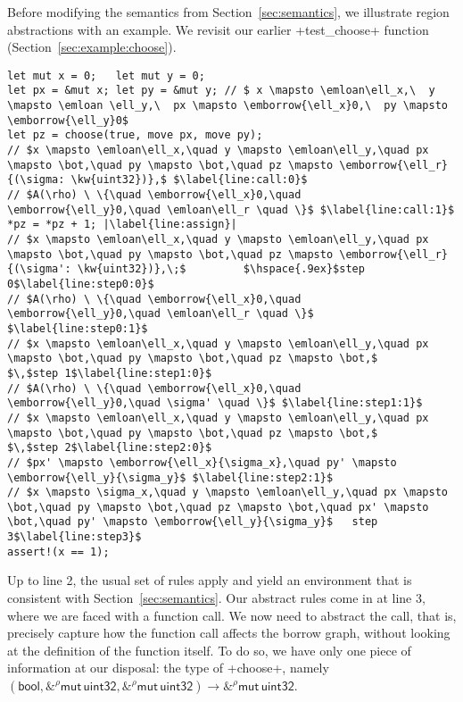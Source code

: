 \documentclass[acmsmall,screen]{acmart}
\newcommand{\sref}[1]{Section~\ref{sec:#1}}
\newcommand\kw[1]{\ensuremath{\mathsf{#1}}}
\newcommand\tmbrw[2]{\ensuremath{\mathsf{\&}^#1\mathsf{mut}\,#2}}
\newcommand\emborrow[2]{\ensuremath{\mathsf{borrow}^m\,#1\;#2}}
\newcommand\emloan[1]{\ensuremath{\mathsf{loan}^m\,#1}}
\begin{document}
Before modifying the semantics from \sref{semantics}, we illustrate region abstractions
with an example. We revisit our earlier \li+test_choose+ function
(\sref{example:choose}).
\begin{verbatim}
let mut x = 0;   let mut y = 0;
let px = &mut x; let py = &mut y; // $ x \mapsto \emloan\ell_x,\  y \mapsto \emloan \ell_y,\  px \mapsto \emborrow{\ell_x}0,\  py \mapsto \emborrow{\ell_y}0$
let pz = choose(true, move px, move py);
// $x \mapsto \emloan\ell_x,\quad y \mapsto \emloan\ell_y,\quad px \mapsto \bot,\quad py \mapsto \bot,\quad pz \mapsto \emborrow{\ell_r}{(\sigma: \kw{uint32})},$ $\label{line:call:0}$
// $A(\rho) \ \{\quad \emborrow{\ell_x}0,\quad \emborrow{\ell_y}0,\quad \emloan\ell_r \quad \}$ $\label{line:call:1}$
*pz = *pz + 1; |\label{line:assign}|
// $x \mapsto \emloan\ell_x,\quad y \mapsto \emloan\ell_y,\quad px \mapsto \bot,\quad py \mapsto \bot,\quad pz \mapsto \emborrow{\ell_r}{(\sigma': \kw{uint32})},\;$         $\hspace{.9ex}$step 0$\label{line:step0:0}$
// $A(\rho) \ \{\quad \emborrow{\ell_x}0,\quad \emborrow{\ell_y}0,\quad \emloan\ell_r \quad \}$ $\label{line:step0:1}$
// $x \mapsto \emloan\ell_x,\quad y \mapsto \emloan\ell_y,\quad px \mapsto \bot,\quad py \mapsto \bot,\quad pz \mapsto \bot,$                             $\,$step 1$\label{line:step1:0}$
// $A(\rho) \ \{\quad \emborrow{\ell_x}0,\quad \emborrow{\ell_y}0,\quad \sigma' \quad \}$ $\label{line:step1:1}$
// $x \mapsto \emloan\ell_x,\quad y \mapsto \emloan\ell_y,\quad px \mapsto \bot,\quad py \mapsto \bot,\quad pz \mapsto \bot,$                             $\,$step 2$\label{line:step2:0}$
// $px' \mapsto \emborrow{\ell_x}{\sigma_x},\quad py' \mapsto \emborrow{\ell_y}{\sigma_y}$ $\label{line:step2:1}$
// $x \mapsto \sigma_x,\quad y \mapsto \emloan\ell_y,\quad px \mapsto \bot,\quad py \mapsto \bot,\quad pz \mapsto \bot,\quad px' \mapsto \bot,\quad py' \mapsto \emborrow{\ell_y}{\sigma_y}$   step 3$\label{line:step3}$
assert!(x == 1);
\end{verbatim}
Up to line 2, the usual set of rules apply and yield an environment that is
consistent with \sref{semantics}.
Our abstract rules come in at line 3, where we are
faced with a function call. We now need to abstract the call, that is, precisely
capture how the function call affects the borrow graph, without looking at the
definition of the function itself. To do so, we have only one piece of
information at our disposal: the type of \li+choose+, namely
{\small
$(\kw{bool}, \tmbrw\rho{\kw{uint32}}, \tmbrw\rho{\kw{uint32}}) \to
\tmbrw\rho{\kw{uint32}}$}.
\end{document}
